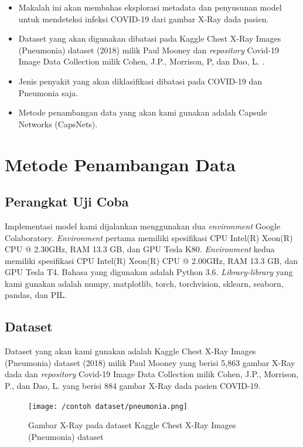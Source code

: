 \documentclass{article}
\begin{document}
	   \begin{itemize}
	   	\item Makalah ini akan membahas eksplorasi metadata dan penyusunan model untuk mendeteksi infeksi COVID-19 dari gambar X-Ray dada pasien\cite{cohen}.
	   	\item Dataset yang akan digunakan dibatasi pada Kaggle Chest X-Ray Images (Pneumonia) dataset (2018) milik Paul Mooney \cite{mooney} dan \textit{repository} Covid-19 Image Data Collection milik Cohen, J.P., Morrison, P, dan Dao, L. \cite{cohen}.
	   	\item Jenis penyakit yang akan diklasifikasi dibatasi pada COVID-19 dan Pneumonia saja.
	   	\item Metode penambangan data yang akan kami gunakan adalah Capsule Networks (CapsNets).
	   \end{itemize}
  \newpage
   \section{Metode Penambangan Data}
    \subsection{Perangkat Uji Coba}
    Implementasi model kami dijalankan menggunakan dua \textit{environment} Google Colaboratory. \textit{Environment} pertama memiliki spesifikasi CPU Intel(R) Xeon(R) CPU @ 2.30GHz, RAM 13.3 GB, dan GPU Tesla K80. \textit{Environment} kedua memiliki spesifikasi CPU Intel(R) Xeon(R) CPU @ 2.00GHz, RAM 13.3 GB, dan GPU Tesla T4. Bahasa yang digunakan adalah Python 3.6. \textit{Library-library} yang kami gunakan adalah numpy, matplotlib, torch, torchvision, sklearn, seaborn, pandas, dan PIL. 
    
    \subsection{Dataset}
    Dataset yang akan kami gunakan adalah Kaggle Chest X-Ray Images (Pneumonia) dataset (2018) milik Paul Mooney \cite{mooney} yang berisi 5,863 gambar X-Ray dada dan \textit{repository} Covid-19 Image Data Collection milik Cohen, J.P., Morrison, P., dan Dao, L. \cite{cohen} yang berisi 884 gambar X-Ray dada pasien COVID-19.
    
    \begin{figure}[H]
    	\centering
    	\texttt{[image: /contoh dataset/pneumonia.png]}
    	\caption{Gambar X-Ray pada dataset Kaggle Chest X-Ray Images (Pneumonia) dataset}
    \end{figure} 
\end{document}
